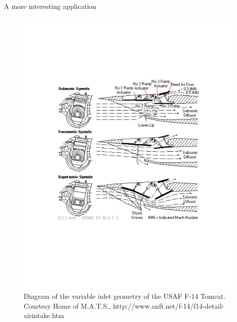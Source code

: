 \documentclass{beamer}
\begin{document}
\begin{frame}{A more interesting application}
\begin{figure}
   \vspace{-.65in}
   \includegraphics[height=\textheight]{F_14_inlet_diagram.pdf}
   \vspace{-.65in}
   \caption{Diagram of the variable inlet geometry of the USAF F-14 Tomcat. Courtesy Home of M.A.T.S., http://www.anft.net/f-14/f14-detail-airintake.htm}
   \label{fig:f-14_diagram}
\end{figure}
\end{frame}
\end{document}
